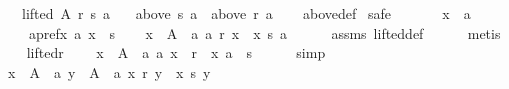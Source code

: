 \begin{isabellebody}
\ \ \ {\isachardoublequoteopen}lifted\ A\ r\ s\ a{\isachardoublequoteclose}\isanewline
\ \ \ {\isachardoublequoteopen}above\ s\ a\ {\isasymsubseteq}\ above\ r\ a{\isachardoublequoteclose}\isanewline
%
\isadelimproof
\ \ %
\endisadelimproof
%
\isatagproof
{}\isamarkupfalse%
\ above{\isacharunderscore}{\kern0pt}def\isanewline
{}\isamarkupfalse%
\ {\isacharparenleft}{\kern0pt}safe{\isacharparenright}{\kern0pt}\isanewline
\ \ \isamarkupfalse%
\isanewline
\ \ \ \ x\ {\isacharcolon}{\kern0pt}{\isacharcolon}{\kern0pt}\ {\isachardoublequoteopen}{\isacharprime}{\kern0pt}a{\isachardoublequoteclose}\isanewline
\ \ \isamarkupfalse%
\isanewline
\ \ \ \ a{\isacharunderscore}{\kern0pt}pref{\isacharunderscore}{\kern0pt}x{\isacharcolon}{\kern0pt}\ {\isachardoublequoteopen}{\isacharparenleft}{\kern0pt}a{\isacharcomma}{\kern0pt}\ x{\isacharparenright}{\kern0pt}\ {\isasymin}\ s{\isachardoublequoteclose}\isanewline
\ \ \isamarkupfalse%
\ {\isachardoublequoteopen}{\isasymexists}x\ {\isasymin}\ A\ {\isacharminus}{\kern0pt}\ {\isacharbraceleft}{\kern0pt}a{\isacharbraceright}{\kern0pt}{\isachardot}{\kern0pt}\ a\ {\isasympreceq}\isactrlsub r\ x\ {\isasymand}\ x\ {\isasympreceq}\isactrlsub s\ a{\isachardoublequoteclose}\isanewline
\ \ \ \ \isamarkupfalse%
\ assms\ lifted{\isacharunderscore}{\kern0pt}def\isanewline
\ \ \ \ \isamarkupfalse%
\ metis\isanewline
\ \ \isamarkupfalse%
\ lifted{\isacharunderscore}{\kern0pt}r{\isacharcolon}{\kern0pt}\isanewline
\ \ \ \ {\isachardoublequoteopen}{\isasymexists}x\ {\isasymin}\ A\ {\isacharminus}{\kern0pt}\ {\isacharbraceleft}{\kern0pt}a{\isacharbraceright}{\kern0pt}{\isachardot}{\kern0pt}\ {\isacharparenleft}{\kern0pt}a{\isacharcomma}{\kern0pt}\ x{\isacharparenright}{\kern0pt}\ {\isasymin}\ r\ {\isasymand}\ {\isacharparenleft}{\kern0pt}x{\isacharcomma}{\kern0pt}\ a{\isacharparenright}{\kern0pt}\ {\isasymin}\ s{\isachardoublequoteclose}\isanewline
\ \ \ \ \isamarkupfalse%
\ simp\isanewline
\ \ \isamarkupfalse%
\ {\isachardoublequoteopen}{\isasymforall}x\ {\isasymin}\ A\ {\isacharminus}{\kern0pt}\ {\isacharbraceleft}{\kern0pt}a{\isacharbraceright}{\kern0pt}{\isachardot}{\kern0pt}\ {\isasymforall}y\ {\isasymin}\ A\ {\isacharminus}{\kern0pt}\ {\isacharbraceleft}{\kern0pt}a{\isacharbraceright}{\kern0pt}{\isachardot}{\kern0pt}\ x\ {\isasympreceq}\isactrlsub r\ y\ {\isasymlongleftrightarrow}\ x\ {\isasympreceq}\isactrlsub s\ y{\isachardoublequoteclose}\isanewline

\end{isabellebody}
